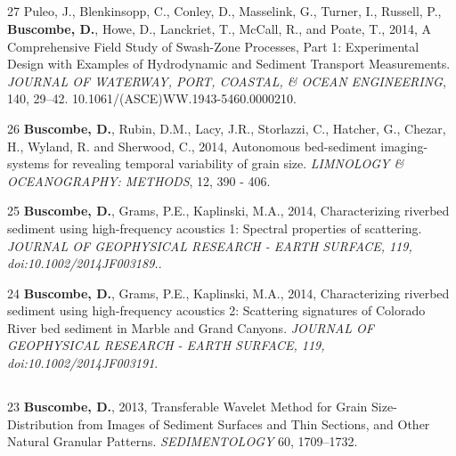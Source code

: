 \documentclass[margin,line]{resume}
\begin{document}
\begin{resume}
\begin{footnotesize}
\begin{list1}
	\end{list1}
	
	\subsection{}
	\begin{list1}
        \item[27] Puleo, J., Blenkinsopp, C., Conley, D., Masselink, G., Turner, I., Russell, P., {\bf Buscombe, D.}, Howe, D., Lanckriet, T., McCall, R., and Poate, T., 2014, A Comprehensive Field Study of Swash-Zone Processes, Part 1: Experimental Design with Examples of Hydrodynamic and Sediment Transport Measurements. {\sl JOURNAL OF WATERWAY, PORT, COASTAL, \& OCEAN ENGINEERING}, 140, 29–42. 10.1061/(ASCE)WW.1943-5460.0000210.\\

	\item[26]  {\bf Buscombe, D.}, Rubin, D.M., Lacy, J.R., Storlazzi, C., Hatcher, G., Chezar, H., Wyland, R. and Sherwood, C., 2014, Autonomous bed-sediment imaging-systems for revealing temporal variability of grain size. {\sl LIMNOLOGY \& OCEANOGRAPHY: METHODS}, 12, 390 - 406. \\

	\item[25] {\bf Buscombe, D.}, Grams, P.E., Kaplinski, M.A., 2014, Characterizing riverbed sediment using high-frequency acoustics 1: Spectral properties of scattering. {\sl JOURNAL OF GEOPHYSICAL RESEARCH - EARTH SURFACE, 119, doi:10.1002/2014JF003189.}.\\

	\item[24] {\bf Buscombe, D.}, Grams, P.E., Kaplinski, M.A., 2014, Characterizing riverbed sediment using high-frequency acoustics 2: Scattering signatures of Colorado River bed sediment in Marble and Grand Canyons. {\sl JOURNAL OF GEOPHYSICAL RESEARCH - EARTH SURFACE, 119, doi:10.1002/2014JF003191}.

	\end{list1}

	\subsection{}
	\begin{list1}
        \item[23] {\bf Buscombe, D.}, 2013, Transferable Wavelet Method for Grain Size-Distribution from Images of Sediment Surfaces and Thin Sections, and Other Natural Granular Patterns. {\sl SEDIMENTOLOGY} 60, 1709--1732. 


\end{list1}
\end{footnotesize}
\end{resume}
\end{document}
